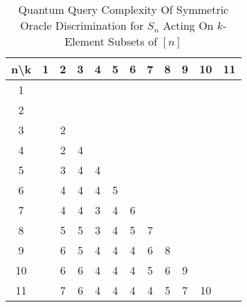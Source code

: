 \documentclass[12pt,twoside]{reedthesis}
\theoremstyle{plain}   %
\theoremstyle{definition}
\theoremstyle{remark}
\numberwithin{equation}{section}
\begin{document}
  \begin{table}[htbp]
\caption[Quantum Query Complexity Of Symmetric Oracle Discrimination for $S_n$ Acting On $k$-Element Subsets of ${[n ]}$]{Quantum Query Complexity Of Symmetric Oracle Discrimination for $S_n$ Acting On $k$-Element Subsets of ${[n]}$} 
\begin{center} 
\begin{tabular}{c  c c c c c c c c c c c} 
\toprule %
  n\textbackslash k &  1 & 2 & 3 & 4 & 5 & 6 & 7 & 8 & 9 & 10 & 11\\ %
  \midrule %
        1 & ~ & ~ & ~ & ~ & ~ & ~ & ~ & ~ & ~ & ~ & ~ \\ 
        2 & ~ & ~ & ~ & ~ & ~ & ~ & ~ & ~ & ~ & ~ & ~ \\ 
        3 & ~ & 2 & ~ & ~ & ~ & ~ & ~ & ~ & ~ & ~ & ~ \\ 
        4 & ~ & 2 & 4 & ~ & ~ & ~ & ~ & ~ & ~ & ~ & ~ \\ 
        5 & ~ & 3 & 4 & 4 & ~ & ~ & ~ & ~ & ~ & ~ & ~ \\ 
        6 & ~ & 4 & 4 & 4 & 5 & ~ & ~ & ~ & ~ & ~ & ~ \\ 
        7 & ~ & 4 & 4 & 3 & 4 & 6 & ~ & ~ & ~ & ~ & ~ \\ 
        8 & ~ & 5 & 5 & 3 & 4 & 5 & 7 & ~ & ~ & ~ & ~ \\ 
        9 & ~ & 6 & 5 & 4 & 4 & 4 & 6 & 8 & ~ & ~ & ~ \\ 
        10 & ~ & 6 & 6 & 4 & 4 & 4 & 5 & 6 & 9 & ~ & ~ \\ 
        11 & ~ & 7 & 6 & 4 & 4 & 4 & 4 & 5 & 7 & 10 & ~ \\ 

\end{tabular}
\end{center}
\end{table}
\end{document}
